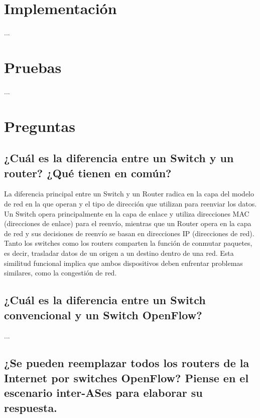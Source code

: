 \documentclass[titlepage,a4paper]{article}
\begin{document}
\section{Implementación}\label{sec:implementacion}

...

\section{Pruebas}\label{sec:pruebas}

...

\section{Preguntas}\label{sec:preguntasAResponder}

    \subsection{¿Cuál es la diferencia entre un Switch y un router? ¿Qué tienen en común?}

    La diferencia principal entre un Switch y un Router radica en la capa del modelo de red en la que operan y el tipo de dirección que utilizan para reenviar los datos. Un Switch opera principalmente en la capa de enlace y utiliza direcciones MAC (direcciones de enlace) para el reenvío, mientras que un Router opera en la capa de red y sus decisiones de reenvío se basan en direcciones IP (direcciones de red). \\
    Tanto los switches como los routers comparten la función de conmutar paquetes, es decir, trasladar datos de un origen a un destino dentro de una red. Esta similitud funcional implica que ambos dispositivos deben enfrentar problemas similares, como la congestión de red.
    
    \subsection{¿Cuál es la diferencia entre un Switch convencional y un Switch OpenFlow?}

    ...
     
    \subsection{¿Se pueden reemplazar todos los routers de la Internet por switches OpenFlow? Piense en el escenario inter-ASes para elaborar su respuesta.}
\end{document}
